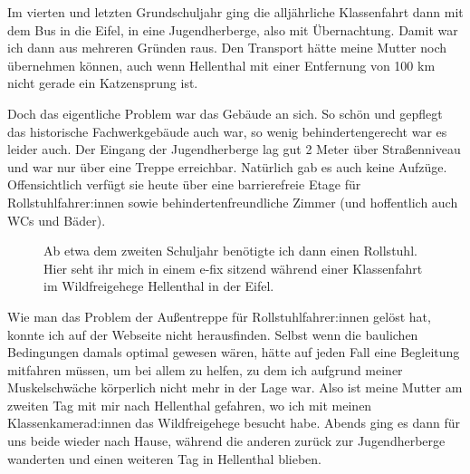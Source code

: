 \documentclass[fontsize=14pt,a4paper,headinclude,DIV=calc,automark]{scrbook}
\begin{document}
Im vierten und letzten Grundschuljahr ging die alljährliche Klassenfahrt dann mit dem Bus in die Eifel, in eine Jugendherberge, also mit Übernachtung. Damit war ich dann aus mehreren Gründen raus. Den Transport hätte meine Mutter noch übernehmen können, auch wenn Hellenthal mit einer Entfernung von 100 km nicht gerade ein Katzensprung ist.

Doch das eigentliche Problem war das Gebäude an sich. So schön und gepflegt das historische Fachwerkgebäude auch war, so wenig behindertengerecht war es leider auch. Der Eingang der Jugendherberge lag gut 2 Meter über Straßenniveau und war nur über eine Treppe erreichbar. Natürlich gab es auch keine Aufzüge. Offensichtlich verfügt sie heute über eine barrierefreie Etage für Rollstuhlfahrer:innen sowie behindertenfreundliche Zimmer (und hoffentlich auch WCs und Bäder).

\setlength{\fboxsep}{0pt}    %
\setlength{\fboxrule}{0.2pt} %
\begin{figure}[ht]
    \centering
    \caption{Ab etwa dem zweiten Schuljahr benötigte ich dann einen Rollstuhl. Hier seht ihr mich in einem e-fix sitzend während einer Klassenfahrt im Wildfreigehege Hellenthal in der Eifel.}
    \label{fig:schule1}
\end{figure}

Wie man das Problem der Außentreppe für Rollstuhlfahrer:innen gelöst hat, konnte ich auf der Webseite nicht herausfinden. Selbst wenn die baulichen Bedingungen damals optimal gewesen wären, hätte auf jeden Fall eine Begleitung mitfahren müssen, um bei allem zu helfen, zu dem ich aufgrund meiner Muskelschwäche körperlich nicht mehr in der Lage war. Also ist meine Mutter am zweiten Tag mit mir nach Hellenthal gefahren, wo ich mit meinen Klassenkamerad:innen das Wildfreigehege besucht habe. Abends ging es dann für uns beide wieder nach Hause, während die anderen zurück zur Jugendherberge wanderten und einen weiteren Tag in Hellenthal blieben.
\end{document}
